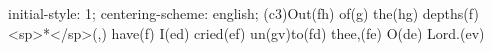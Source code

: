 initial-style: 1;
centering-scheme: english;
(c3)Out(fh) of(g) the(hg) depths(f) <sp>*</sp>(,) have(f) I(ed) cried(ef) un(gv)to(fd) thee,(fe) O(de) Lord.(ev)
